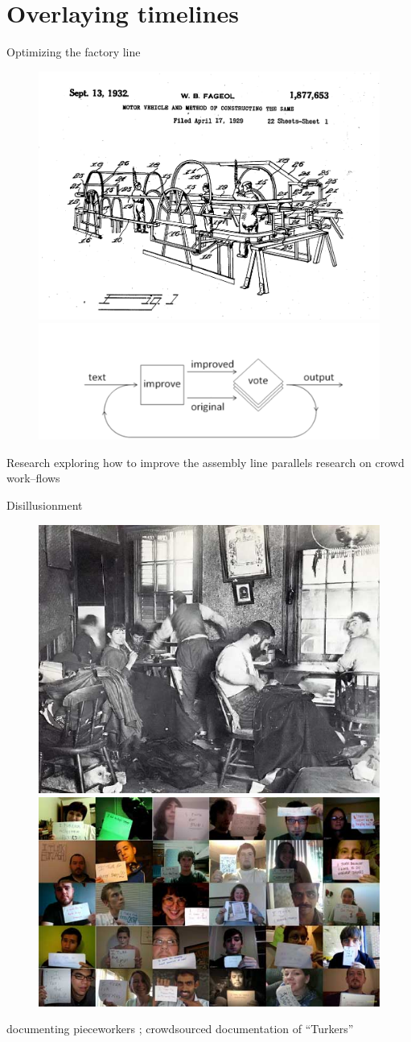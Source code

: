 \documentclass{beamer}
\begin{document}
\section{Overlaying timelines}

\begin{frame}{Optimizing the factory line}
  \begin{figure}
    \includegraphics[width=0.5\linewidth]{figures/making_cars}
    \includegraphics[width=0.5\linewidth]{figures/workflow_crowd.png}
  \end{figure}
  Research exploring how to improve the assembly line %
  \cite{fageol1932motor,hu1961parallel}
  parallels research on crowd work--flows
  \cite[e.g.][]{weld2010decision}
\end{frame}

\begin{frame}{Disillusionment}
  \begin{figure}
    \includegraphics[width=0.43\linewidth]{figures/how_the_other_half_works.jpg}
    \includegraphics[width=0.57\linewidth]{figures/faces_of_mechanical_turk_small.jpg}
  \end{figure}
  \citeauthor{riisOtherSideLives} documenting pieceworkers \cite{riisOtherSideLives};
  crowdsourced documentation of ``Turkers'' \cite{facesOfMechanicalTurk}
\end{frame}
\end{document}
